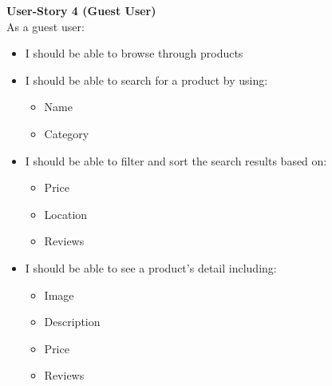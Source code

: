 \documentclass[11pt]{article}
\newcounter{use case ID}
\begin{document}
\textbf{User-Story 4 (Guest User)} \\
As a guest user:
\begin{itemize}
    \item I should be able to browse through products
    \item I should be able to search for a product by using:
    \begin{itemize}
        \item Name
        \item Category
    \end{itemize}
    \item I should be able to filter and sort the search results based on:
        \begin{itemize}
            \item Price
            \item Location
            \item Reviews
        \end{itemize}
    \item I should be able to see a product's detail including:
        \begin{itemize}
            \item Image
            \item Description
            \item Price
            \item Reviews
        \end{itemize}
\end{itemize}
\end{document}
